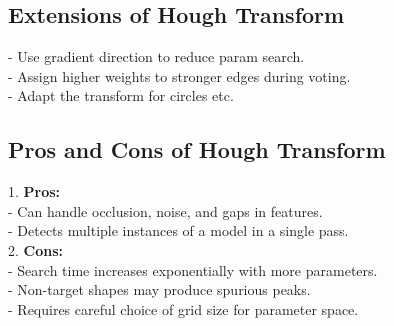 \subsection*{Extensions of Hough Transform}
- Use gradient direction to reduce param search. \\
- Assign higher weights to stronger edges during voting. \\
- Adapt the transform for circles etc. \\


\subsection*{Pros and Cons of Hough Transform}
1. \textbf{Pros:} \\
   - Can handle occlusion, noise, and gaps in features. \\
   - Detects multiple instances of a model in a single pass. \\
2. \textbf{Cons:} \\
   - Search time increases exponentially with more parameters. \\
   - Non-target shapes may produce spurious peaks. \\
   - Requires careful choice of grid size for parameter space.
